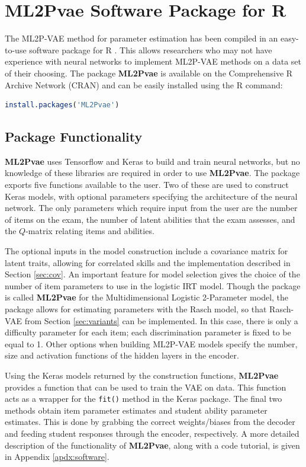 \section{\textbf{ML2Pvae} Software Package for R}
The ML2P-VAE method for parameter estimation has been compiled in an easy-to-use software package for R \cite{r_package}. This allows researchers who may not have experience with neural networks to implement ML2P-VAE methods on a data set of their choosing. The package \textbf{ML2Pvae} is available on the Comprehensive R Archive Network (CRAN) and can be easily installed using the R command:
\begin{lstlisting}[language=R, numbers=none]
install.packages('ML2Pvae')
\end{lstlisting}

\subsection{Package Functionality}
\textbf{ML2Pvae} uses Tensorflow and Keras to build and train neural networks, but no knowledge of these libraries are required in order to use \textbf{ML2Pvae}. The package exports five functions available to the user. Two of these are used to construct Keras models, with optional parameters specifying the architecture of the neural network. The only parameters which require input from the user are the number of items on the exam, the number of latent abilities that the exam assesses, and the $Q$-matrix relating items and abilities.

The optional inputs in the model construction include a covariance matrix for latent traits, allowing for correlated skills and the implementation described in Section \ref{sec:cov}. An important feature for model selection gives the choice of the number of item parameters to use in the logistic IRT model. Though the package is called \textbf{ML2Pvae} for the Multidimensional Logistic 2-Parameter model, the package allows for estimating parameters with the Rasch model, so that Rasch-VAE from Section \ref{sec:variants} can be implemented. In this case, there is only a difficulty parameter for each item; each  discrimination parameter is fixed to be equal to 1. Other options when building ML2P-VAE models specify the number, size and activation functions of the hidden layers in the encoder.

Using the Keras models returned by the construction functions, \textbf{ML2Pvae} provides a function that can be used to train the VAE on data. This function acts as a wrapper for the \verb!fit()! method in the Keras package. The final two methods obtain item parameter estimates and student ability parameter estimates. This is done by grabbing the correct weights/biases from the decoder and feeding student responses through the encoder, respectively. A more detailed description of the functionality of \textbf{ML2Pvae}, along with a code tutorial, is given in Appendix \ref{apdx:software}.

